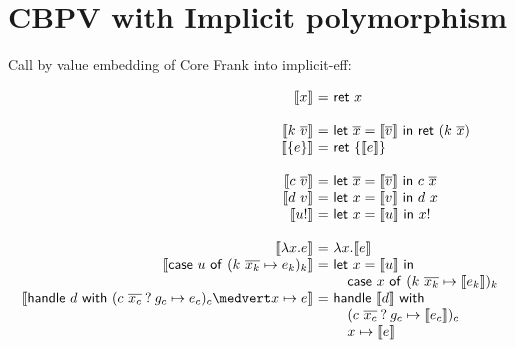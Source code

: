 \documentclass[preprint]{sigplanconf}
\makeatletter
\newcommand{\many}{\overline}
\newcommand{\sem}[1]{\llbracket{#1}\rrbracket}
\newcommand\ba{\begin{array}}
\newcommand\ea{\end{array}}
\newenvironment{equations}{\[\ba{@{}r@{~}c@{~}l@{}}}{\ea\]}
\newcommand{\key}[1]{\mathsf{#1}}
\newcommand{\handleSymbol}{\mathbin{?}}
\newcommand{\handle}[2]{{#1} \handleSymbol {#2}}
\newcommand{\thunk}[1]{\{{#1}\}}
\newcommand{\force}[1]{{#1}!}
\makeatother
\begin{document}


\section{CBPV with Implicit polymorphism}

Call by value embedding of Core Frank into implicit-eff:

\begin{equations}
\sem{x} &=& \key{ret}~x \\
\\
\sem{k~\many{v}} &=& \key{let}~\many{x}=\sem{\many{v}} ~\key{in}~\key{ret}~(k~\many{x}) \\
\sem{\thunk{e}} &=& \key{ret}~\thunk{\sem{e}} \\
\\
\sem{c~\many{v}} &=& \key{let}~\many{x}=\sem{\many{v}} ~\key{in}~c~\many{x} \\
\sem{d~v} &=& \key{let}~x=\sem{v} ~\key{in}~d~x \\
\sem{\force{u}} &=& \key{let}~x=\sem{u} ~\key{in}~\force{x} \\
\\
\sem{\lambda x.e} &=& \lambda x.\sem{e} \\
\sem{\key{case}~u~\key{of}~(k~\many{x_k} \mapsto e_k)_k}
  &=& \key{let}~x=\sem{u} ~\key{in} \\
  &&  \quad \key{case}~x~\key{of}~(k~\many{x_k} \mapsto \sem{e_k})_k \\
\sem{\key{handle}~d~\key{with}~(\handle{c~\many{x_c}}{g_c} \mapsto e_c)_c \medvert x \mapsto e}
  &=& \key{handle}~\sem{d}~\key{with} \\
  &&  \quad (\handle{c~\many{x_c}}{g_c} \mapsto \sem{e_c})_c \\
  &&  \quad x \mapsto \sem{e}\\
\end{equations}
\end{document}
